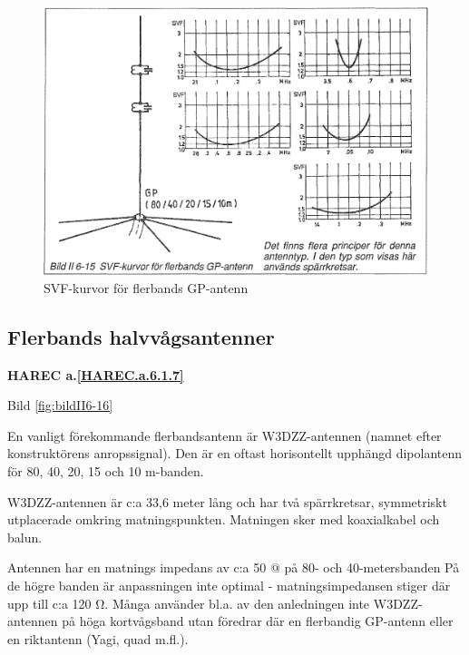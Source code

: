 \begin{figure}
  \includegraphics[width=\textwidth]{images/bild_2_6-15}
  \caption{SVF-kurvor för flerbands GP-antenn}
  \label{fig:bildII6-15}
\end{figure}

\subsection{Flerbands halvvågsantenner}
\textbf{
HAREC a.\ref{HAREC.a.6.1.7}\label{myHAREC.a.6.1.7}
}

Bild \ref{fig:bildII6-16}
\label{W3DZZ}

En vanligt förekommande flerbandsantenn är W3DZZ-antennen (namnet
efter konstruktörens anropssignal). Den är en oftast horisontellt
upphängd dipolantenn för 80, 40, 20, 15 och 10 m-banden.

W3DZZ-antennen är c:a 33,6 meter lång och har två spärrkretsar,
symmetriskt utplacerade omkring matningspunkten. Matningen sker med
koaxialkabel och balun.

Antennen har en matnings impedans av c:a 50 @ på 80- och
40-metersbanden På de högre banden är anpassningen inte optimal -
matningsimpedansen stiger där upp till c:a 120 Ω. Många använder
bl.a. av den anledningen inte W3DZZ-antennen på höga kortvågsband utan
föredrar där en flerbandig GP-antenn eller en riktantenn (Yagi, quad
m.fl.).

